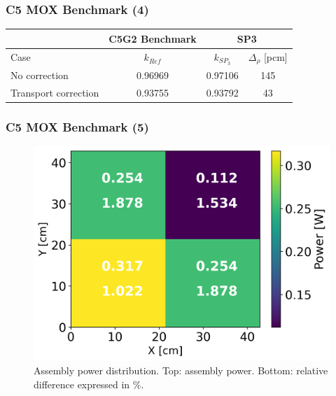 
\begin{frame}
\frametitle{C5 MOX Benchmark (4)}
	\begin{table}[htbp!]
	\centering
	\begin{tabular}{lccc}
	\toprule
	 & C5G2 Benchmark      & \multicolumn{2}{c}{SP3}          \\
	\midrule
	Case & $k_{Ref}$       & $k_{SP_3}$ & $\Delta_\rho$ [pcm] \\
	\midrule
	No correction          & 0.96969  & 0.97106  & 145  \\
	Transport correction   & 0.93755  & 0.93792  &  43  \\
	\bottomrule
	\end{tabular}
	\label{tab:2d-keff}
	\end{table}
\end{frame}


\begin{frame}
\frametitle{C5 MOX Benchmark (5)}

    \begin{figure}[htbp!]
        \begin{center}
            \includegraphics[width=6.cm]{figures/distrib}
        \end{center}
        \caption{Assembly power distribution. Top: assembly power. Bottom: relative difference expressed in \%.}
    \end{figure}

\end{frame}
